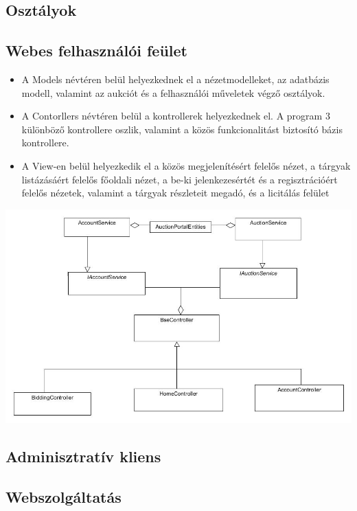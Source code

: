 \documentclass[12pt,a4paper]{article}
\begin{document}
\subsection{Osztályok}
\subsection{Webes felhasználói feület}
\begin{itemize}
\item A Models névtéren belül helyezkednek el a nézetmodelleket, az adatbázis modell, valamint az aukciót és a felhasználói műveletek végző osztályok.
\item A Contorllers névtéren belül a kontrollerek helyezkednek el. A program 3 különböző kontrollere oszlik, valamint a közös funkcionalitást biztosító bázis kontrollere.
\item A View-en belül helyezkedik el a közös megjelenítésért felelős nézet, a tárgyak listázásáért felelős főoldali nézet,  a be-ki jelenkezesértét és a regisztrációért felelős nézetek, valamint a tárgyak részleteit megadó, és a licitálás felület
\end{itemize}
\includegraphics[scale=0.5]{osztaly_szerkezet.jpg}

\subsection{Adminisztratív kliens}

\subsection{Webszolgáltatás}
\end{document}
